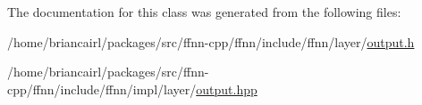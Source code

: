The documentation for this class was generated from the following files\-:\begin{DoxyCompactItemize}
\item 
/home/briancairl/packages/src/ffnn-\/cpp/ffnn/include/ffnn/layer/\hyperlink{output_8h}{output.\-h}\item 
/home/briancairl/packages/src/ffnn-\/cpp/ffnn/include/ffnn/impl/layer/\hyperlink{output_8hpp}{output.\-hpp}\end{DoxyCompactItemize}
